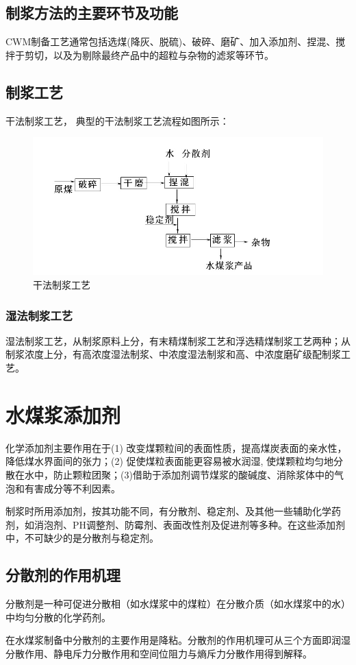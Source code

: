 \documentclass[10pt,openany]{ctexbook}
\begin{document}
\subsection{制浆方法的主要环节及功能}
 CWM制备工艺通常包括选煤(降灰、脱硫)、破碎、磨矿、加入添加剂、捏混、搅拌于剪切，以及为剔除最终产品中的超粒与杂物的滤浆等环节。
\subsection{制浆工艺 }

干法制浆工艺， 典型的干法制浆工艺流程如图所示：
     \begin{figure}[!ht]
\includegraphics[scale=0.6]{32}
\caption{干法制浆工艺}
\end{figure}
\subsubsection{湿法制浆工艺}
湿法制浆工艺，从制浆原料上分，有末精煤制浆工艺和浮选精煤制浆工艺两种；从制浆浓度上分，有高浓度湿法制浆、中浓度湿法制浆和高、中浓度磨矿级配制浆工艺。
\section{水煤浆添加剂}
化学添加剂主要作用在于(1) 改变煤颗粒间的表面性质，提高煤炭表面的亲水性，降低煤水界面间的张力；(2) 促使煤粒表面能更容易被水润湿, 使煤颗粒均匀地分散在水中，防止颗粒团聚；(3)借助于添加剂调节煤浆的酸碱度、消除浆体中的气泡和有害成分等不利因素。 \par
    制浆时所用添加剂，按其功能不同，有分散剂、稳定剂、及其他一些辅助化学药剂，如消泡剂、PH调整剂、防霉剂、表面改性剂及促进剂等多种。在这些添加剂中，不可缺少的是分散剂与稳定剂。
    \subsection{分散剂的作用机理}
分散剂是一种可促进分散相（如水煤浆中的煤粒）在分散介质（如水煤浆中的水）中均匀分散的化学药剂。\par
       在水煤浆制备中分散剂的主要作用是降粘。分散剂的作用机理可从三个方面即润湿分散作用、静电斥力分散作用和空间位阻力与熵斥力分散作用得到解释。
\end{document}
